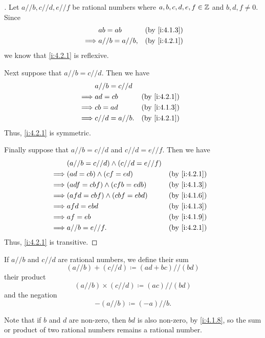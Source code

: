 \begin{proof}[]
  Let \(a // b, c // d, e // f\) be rational numbers where \(a, b, c, d, e, f \in \mathbb{Z}\) and \(b, d, f \neq 0\).
  Since
  \begin{align*}
             & ab = ab          &  & \by{i:4.1.3} \\
    \implies & a // b = a // b, &  & \by{i:4.2.1}
  \end{align*}
  we know that \cref{i:4.2.1} is reflexive.

  Next suppose that \(a // b = c // d\).
  Then we have
  \begin{align*}
             & a // b = c // d                    \\
    \implies & ad = cb          &  & \by{i:4.2.1} \\
    \implies & cb = ad          &  & \by{i:4.1.3} \\
    \implies & c // d = a // b. &  & \by{i:4.2.1}
  \end{align*}
  Thus, \cref{i:4.2.1} is symmetric.

  Finally suppose that \(a // b = c // d\) and \(c // d = e // f\).
  Then we have
  \begin{align*}
             & (a // b = c // d) \land (c // d = e // f)                   \\
    \implies & (ad = cb) \land (cf = ed)                 &  & \by{i:4.2.1} \\
    \implies & (adf = cbf) \land (cfb = edb)             &  & \by{i:4.1.3} \\
    \implies & (afd = cbf) \land (cbf = ebd)             &  & \by{i:4.1.6} \\
    \implies & afd = ebd                                 &  & \by{i:4.1.3} \\
    \implies & af = eb                                   &  & \by{i:4.1.9} \\
    \implies & a // b = e // f.                          &  & \by{i:4.2.1}
  \end{align*}
  Thus, \cref{i:4.2.1} is transitive.
\end{proof}

\begin{defn}\label{i:4.2.2}
  If \(a // b\) and \(c // d\) are rational numbers, we define their sum
  \[
    (a // b) + (c // d) \coloneqq (ad + bc) // (bd)
  \]
  their product
  \[
    (a // b) \times (c // d) \coloneqq (ac) // (bd)
  \]
  and the negation
  \[
    -(a // b) \coloneqq (-a) // b.
  \]

  Note that if \(b\) and \(d\) are non-zero, then \(bd\) is also non-zero, by \cref{i:4.1.8}, so the sum or product of two rational numbers remains a rational number.
\end{defn}

